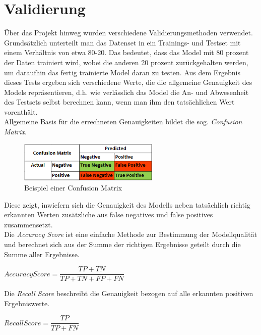 \section{Validierung}
\sloppy
Über das Projekt hinweg wurden verschiedene Validierungsmethoden verwendet. Grundsätzlich unterteilt man das 
Datenset in ein Trainings- und Testset mit einem Verhältnis von etwa 80-20. Das bedeutet, dass das Model mit
80 prozent der Daten trainiert wird, wobei die anderen 20 prozent zurückgehalten werden, um daraufhin das 
fertig trainierte Model daran zu testen. Aus dem Ergebnis dieses Tests ergeben sich verschiedene Werte, die  
die allgemeine Genauigkeit des Models repräsentieren, d.h. wie verlässlich das Model die An- und Abwesenheit 
des Testsets selbst berechnen kann, wenn man ihm den tatsächlichen Wert vorenthält.\\
Allgemeine Basis für die errechneten Genauigkeiten bildet die sog. \textit{Confusion Matrix}.

\begin{figure}[h]
    \centering
    \includegraphics[width=0.6\textwidth]{pic/confusion_matrix_ex.png}
    \caption{Beispiel einer Confusion Matrix}
    \label{fig:CV}
\end{figure}

Diese zeigt, inwiefern sich die Genauigkeit des Modells neben tatsächlich richtig erkannten Werten zusätzliche
aus false negatives und false positives zusammensetzt.\\
\newpage
Die \textit{Accuracy Score} ist eine einfache Methode zur Bestimmung der Modellqualität und berechnet sich 
aus der Summe der richtigen Ergebnisse geteilt durch die Summe aller Ergebnisse.

\begin{center}
    $AccuracyScore = \dfrac{TP + TN}{TP + TN + FP + FN}$    
\end{center}
Die \textit{Recall Score} beschreibt die Genauigkeit bezogen auf alle erkannten positiven Ergebniswerte. 
\begin{center}
    $RecallScore = \dfrac{TP}{TP + FN}$    
\end{center}

